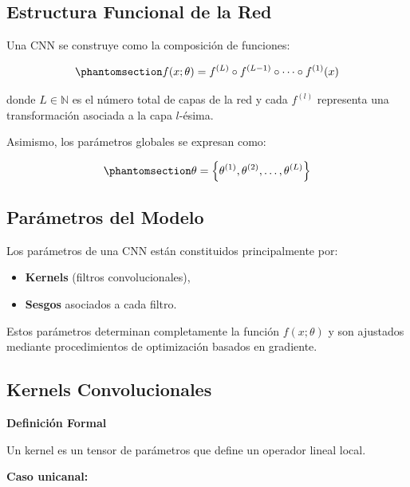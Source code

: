 \documentclass[
  spanish,
  us-letterpaper,
  DIV=11,
  numbers=noendperiod]{scrreprt}
\providecommand{\tightlist}{%
  \setlength{\itemsep}{0pt}\setlength{\parskip}{0pt}}
\begin{document}
\subsection{Estructura Funcional de la
Red}\label{estructura-funcional-de-la-red}

Una CNN se construye como la composición de funciones:

\begin{equation}\phantomsection\label{eq-composicion-cnn}{
f(x;\theta) = f^{(L)} \circ f^{(L-1)} \circ \cdots \circ f^{(1)}(x)
}\end{equation}

donde \(L \in \mathbb{N}\) es el número total de capas de la red y cada
\(f^{(l)}\) representa una transformación asociada a la capa
\(l\)-ésima.

Asimismo, los parámetros globales se expresan como:

\begin{equation}\phantomsection\label{eq-parametros-globales}{
\theta = \left\{ \theta^{(1)}, \theta^{(2)}, \dots, \theta^{(L)} \right\}
}\end{equation}

\subsection{Parámetros del Modelo}\label{paruxe1metros-del-modelo}

Los parámetros de una CNN están constituidos principalmente por:

\begin{itemize}
\tightlist
\item
  \textbf{Kernels} (filtros convolucionales),
\item
  \textbf{Sesgos} asociados a cada filtro.
\end{itemize}

Estos parámetros determinan completamente la función \(f(x;\theta)\) y
son ajustados mediante procedimientos de optimización basados en
gradiente.

\subsection{Kernels Convolucionales}\label{kernels-convolucionales}

\textbf{Definición Formal}

Un kernel es un tensor de parámetros que define un operador lineal
local.

\textbf{Caso unicanal:}
\end{document}
